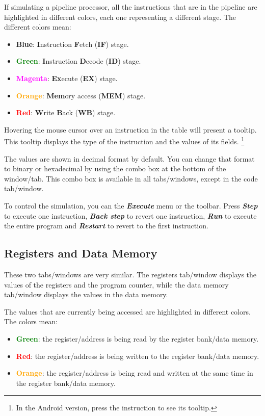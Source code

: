 \documentclass[11pt,a4paper,twoside,titlepage]{article}
\newcommand{\menupath}[1]{\textbf{\emph{#1}}}
\begin{document}
If simulating a pipeline processor, all the instructions that are in the
pipeline are highlighted in different colors, each one representing a
different stage.
The different colors mean:
\begin{itemize}
	\item \textbf{\textcolor{cyan2}{Blue}}: \textbf{I}nstruction 
		\textbf{F}etch (\textbf{IF}) stage.
	\item \textbf{\textcolor{green}{Green}}: \textbf{I}nstruction 
		\textbf{D}ecode (\textbf{ID}) stage.
	\item \textbf{\textcolor{magenta}{Magenta}}: \textbf{Ex}ecute 
		(\textbf{EX}) stage.
	\item \textbf{\textcolor{orange}{Orange}}: \textbf{Mem}ory access
		(\textbf{MEM}) stage.
	\item \textbf{\textcolor{red}{Red}}: \textbf{W}rite \textbf{B}ack 
		(\textbf{WB}) stage.
\end{itemize}

Hovering the mouse cursor over an instruction in the table will present a
tooltip. This tooltip displays the type of the instruction and the values
of its fields. \footnote{In the Android version, press the instruction to
see its tooltip.}

The values are shown in decimal format by default.
You can change that format to binary or hexadecimal by using the combo box
at the bottom of the window/tab.
This combo box is available in all tabs/windows, except in the code tab/window.

To control the simulation, you can the \menupath{Execute} menu or the toolbar.
Press \menupath{Step} to execute one instruction, \menupath{Back step}
to revert one instruction, \menupath{Run} to execute the entire program and
\menupath{Restart} to revert to the first instruction.


\subsection{Registers and Data Memory}

These two tabs/windows are very similar.
The registers tab/window displays the values of the registers and the program
counter, while the data memory tab/window displays the values in the data
memory.

The values that are currently being accessed are highlighted in different 
colors. The colors mean:
\begin{itemize}
	\item \textbf{\textcolor{green}{Green}}: the register/address is being 
		read by the register bank/data memory.
	\item \textbf{\textcolor{red}{Red}}: the register/address is being written 
		to the register bank/data memory.
	\item \textbf{\textcolor{orange}{Orange}}: the register/address is being 
		read and written at the same time in the register bank/data memory.
\end{itemize}
\end{document}
